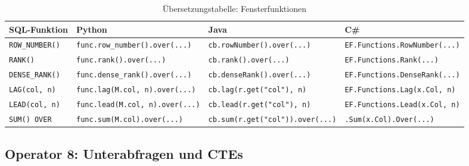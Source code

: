 \begin{table}
\centering
\caption{Übersetzungstabelle: Fensterfunktionen}
\label{tab:window_ops}
\renewcommand{\arraystretch}{1.4}
\begin{tabularx}{\textwidth}{lXXX}
\toprule
\textbf{SQL-Funktion} & \textbf{Python} & \textbf{Java} & \textbf{C\#} \\
\midrule
\texttt{ROW\_NUMBER()}
  & \texttt{func.row\_number().over(...)}
  & \texttt{cb.rowNumber().over(...)}
  & \texttt{EF.Functions.RowNumber(...)} \\
\texttt{RANK()}
  & \texttt{func.rank().over(...)}
  & \texttt{cb.rank().over(...)}
  & \texttt{EF.Functions.Rank(...)} \\
\texttt{DENSE\_RANK()}
  & \texttt{func.dense\_rank().over(...)}
  & \texttt{cb.denseRank().over(...)}
  & \texttt{EF.Functions.DenseRank(...)} \\
\texttt{LAG(col, n)}
  & \texttt{func.lag(M.col, n).over(...)}
  & \texttt{cb.lag(r.get("col"), n)}
  & \texttt{EF.Functions.Lag(x.Col, n)} \\
\texttt{LEAD(col, n)}
  & \texttt{func.lead(M.col, n).over(...)}
  & \texttt{cb.lead(r.get("col"), n)}
  & \texttt{EF.Functions.Lead(x.Col, n)} \\
\texttt{SUM() OVER}
  & \texttt{func.sum(M.col).over(...)}
  & \texttt{cb.sum(r.get("col")).over(...)}
  & \texttt{.Sum(x.Col).Over(...)} \\
\bottomrule
\end{tabularx}
\end{table}

\subsection{Operator 8: Unterabfragen und CTEs}
\label{subsec:op_subquery}

